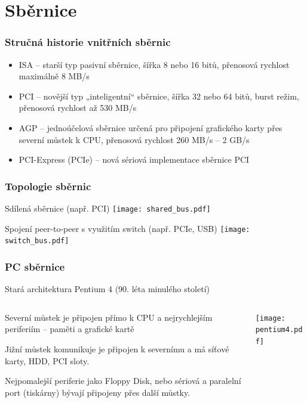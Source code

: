 \documentclass{beamer}
\begin{document}
\section{Sběrnice}

\begin{frame}
\frametitle{Stručná historie vnitřních sběrnic}

\begin{itemize}
\item ISA – starší typ pasivní sběrnice, šířka 8 nebo 16 bitů, přenosová rychlost maximálně 8 MB/s
\item PCI – novější typ „inteligentní“ sběrnice, šířka 32 nebo 64 bitů, burst režim, přenosová rychlost až 530 MB/s
\item AGP – jednoúčelová sběrnice určená pro připojení grafického karty přes severní můstek k CPU, přenosová rychlost 260 MB/s – 2 GB/s
\item PCI-Express (PCIe) – nová sériová implementace sběrnice PCI
\end{itemize}
\end{frame}


\begin{frame}
\frametitle{Topologie sběrnic}
\begin{center}
Sdílená sběrnice (např. PCI)
\texttt{[image: shared\_bus.pdf]}
\end{center}

\begin{center}
Spojení peer-to-peer s využitím switch (např. PCIe, USB)
\texttt{[image: switch\_bus.pdf]}
\end{center}
\end{frame}

\begin{frame}
\frametitle{PC sběrnice}
\begin{center}
Stará architektura Pentium 4 (90. léta minulého století)
\end{center}

\begin{columns}
\begin{column}{0.5\textwidth}
Severní můstek je připojen přímo k CPU a nejrychlejším periferiím -- paměti a grafické kartě
\bigskip

Jižní můstek komunikuje je připojen k severnímu a má síťové karty, HDD, PCI sloty.

\bigskip
Nejpomalejší periferie jako Floppy Disk, nebo sériová a paralelní port (tiskárny) bývají připojeny přes další můstky.
\end{column}
\begin{column}{0.5\textwidth}  
\texttt{[image: pentium4.pdf]}
\end{column}
\end{columns}
\end{frame}
\end{document}
